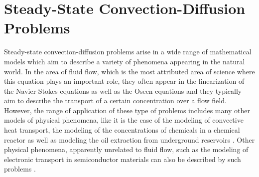 
\section{Steady-State Convection-Diffusion Problems}
\label{back:convdiff}

Steady-state convection-diffusion problems arise in a wide range of
mathematical models which aim to describe a variety of phenomena appearing in
the natural world.
In the area of fluid flow, which is the most attributed area of science where
this equation plays an important role, they often appear in the linearization
of the Navier-Stokes equations as well as the Oseen equations \cite{BenOls06}
and they typically aim to describe the transport of a certain concentration
over a flow field. However, the range of application of these type of
problems includes many other models of physical phenomena, like it is the
case of the modeling of convective heat transport, the modeling of the
concentrations of chemicals in a chemical reactor \cite{GraKos74} as well as
modeling the oil extraction from underground reservoirs
\cite{ChaSunZheLu18}. Other physical phenomena, apparently unrelated to fluid
flow, such as the modeling of electronic transport in semiconductor materials
can also be described by such problems \cite{MarSzm89}.

